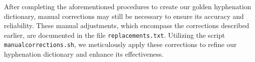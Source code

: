 

%
%



After completing the aforementioned procedures to create our golden hyphenation
dictionary, manual corrections may still be necessary to ensure its accuracy
and reliability. These manual adjustments, which encompass the corrections
described earlier, are documented in the file \texttt{replacements.txt}.
Utilizing the script \texttt{manualcorrections.sh}, we meticulously apply these
corrections to refine our hyphenation dictionary and enhance its effectiveness.






